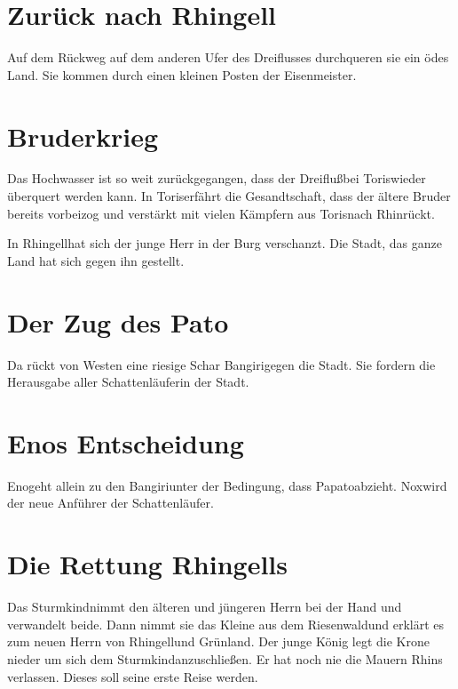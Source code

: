\documentclass[12pt,a4paper,onecolumn,twoside,ngerman]{book}
\newcommand{\Sturmkind}{Sturmkind}
\newcommand{\Bangiri}{Bangiri}
\newcommand{\Pato}{Pato}
\newcommand{\Papato}{Papato}
\newcommand{\Schattenlaufer}{Schattenläufer}
\newcommand{\Eno}{Eno}
\newcommand{\Nox}{Nox}
\newcommand{\Rhingell}{Rhingell}
\newcommand{\Rhin}{Rhin}
\newcommand{\Dreifluss}{Dreifluß}
\newcommand{\Toris}{Toris}
\newcommand{\Grunland}{Grünland}
\newcommand{\Riesenwald}{Riesenwald}
\newcommand{\Eisenmeister}{Eisenmeister}
\begin{document}
\section{Zurück nach \Rhingell}
Auf dem Rückweg auf dem anderen Ufer des Dreiflusses durchqueren sie ein ödes Land. Sie kommen durch einen kleinen Posten der \Eisenmeister. 



\section{Bruderkrieg}
Das Hochwasser ist so weit zurückgegangen, dass der \Dreifluss bei \Toris wieder überquert werden kann. In \Toris erfährt die Gesandtschaft, dass der ältere Bruder bereits vorbeizog und verstärkt mit vielen Kämpfern aus \Toris nach \Rhin rückt. 

In \Rhingell hat sich der junge Herr in der Burg verschanzt. Die Stadt, das ganze Land hat sich gegen ihn gestellt. 

\section{Der Zug des \Pato}
Da rückt von Westen eine riesige Schar \Bangiri gegen die Stadt. Sie fordern die Herausgabe aller \Schattenlaufer in der Stadt.

\section{{\Eno}s Entscheidung}
\Eno geht allein zu den \Bangiri unter der Bedingung, dass \Papato abzieht. \Nox wird der neue Anführer der Schattenläufer.

\section{Die Rettung \Rhingell{s}}
Das \Sturmkind nimmt den älteren und jüngeren Herrn bei der Hand und verwandelt beide. Dann nimmt sie das Kleine aus dem \Riesenwald und erklärt es zum neuen Herrn von \Rhingell und \Grunland. Der junge König legt die Krone nieder um sich dem \Sturmkind anzuschließen. Er hat noch nie die Mauern \Rhin{s} verlassen. Dieses soll seine erste Reise werden.
\end{document}
